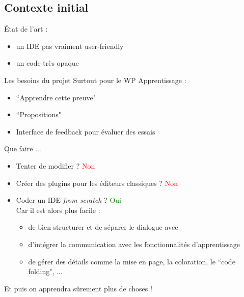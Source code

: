 \newcommand{\qcodeedit}{QCodeEdit}
\newcommand{\qtermwidget}{QTermWidget}
\newcommand{\stdout}{StdOut}
\newcommand{\stderr}{StdErr}

\subsection{Contexte initial}

    \begin{frame}{État de l'art : \coqide{}}

        \begin{itemize}
        	\item un IDE pas vraiment user-friendly
        	\item un code très opaque
	    \end{itemize}
	\end{frame}
		
	\begin{frame}{Les besoins du projet \coquille{}}
        Surtout pour le WP Apprentissage :
	    \begin{itemize}
		    \item ``Apprendre cette preuve"
		    \item ``Propositions"
		    \item Interface de feedback pour évaluer des essais
	    \end{itemize}
	\end{frame}

    \begin{frame}{Que faire $\ldots$}
        \begin{itemize}
        	\item Tenter de modifier \coqide{} ? \pause \textcolor{red}{Non}
        	\pause
        	\item Créer des plugins pour les éditeurs classiques ? \pause \textcolor{red}{Non}
        	\pause
        	\item Coder un IDE \textit{from scratch} ? \pause \textcolor{green}{Oui}\\
        	\pause
        	Car il est alors plus facile :
        	\begin{itemize}
        		\item de bien structurer et de séparer le dialogue avec \coq{}
        		\item d'intégrer la communication avec les fonctionnalités d'apprentissage
        		\item de gérer des détails comme la mise en page, la coloration, le ``code folding", $\ldots$
            \end{itemize}
        \end{itemize}
        \pause
        Et puis on apprendra sûrement plus de choses !
	\end{frame}

